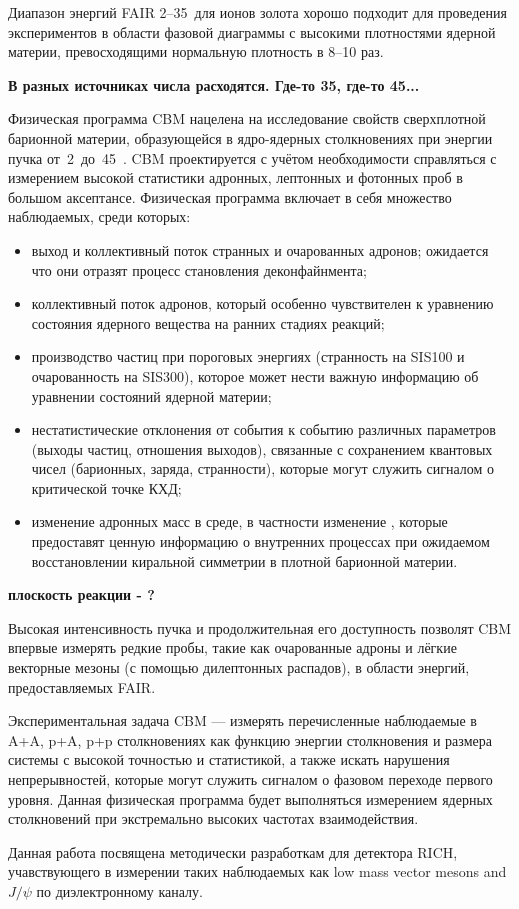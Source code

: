 Диапазон энергий FAIR 2--35~\GeVperNucl для ионов золота хорошо подходит для проведения экспериментов в области фазовой диаграммы с высокими плотностями ядерной материи, превосходящими нормальную плотность в 8--10 раз.

\todo \textbf{В разных источниках числа расходятся. Где-то 35, где-то 45...}

Физическая программа CBM нацелена на исследование свойств сверхплотной барионной материи, образующейся в ядро-ядерных столкновениях при энергии пучка от~2~до~45~\GeVperNucl. CBM проектируется с учётом необходимости справляться с измерением высокой статистики адронных, лептонных и фотонных проб в большом аксептансе. Физическая программа включает в себя множество наблюдаемых, среди которых:

\begin{itemize}
\item выход и коллективный поток странных и очарованных адронов; ожидается что они отразят процесс становления деконфайнмента;
\item коллективный поток адронов, который особенно чувствителен к уравнению состояния ядерного вещества на ранних стадиях реакций;
\item производство частиц при пороговых энергиях (странность на SIS100 и очарованность на SIS300), которое может нести важную информацию об уравнении состояний ядерной материи;
\item нестатистические отклонения от события к событию различных параметров (выходы частиц, отношения выходов), связанные с сохранением квантовых чисел (барионных, заряда, странности), которые могут служить сигналом о критической точке КХД;
\item изменение адронных масс в среде, в частности изменение \todo, которые предоставят ценную информацию о внутренних процессах при ожидаемом восстановлении киральной симметрии в плотной барионной материи.
\end{itemize}

\todo \textbf{плоскость реакции - ?}

Высокая интенсивность пучка и продолжительная его доступность позволят CBM впервые измерять редкие пробы, такие как очарованные адроны и лёгкие векторные мезоны (с помощью дилептонных распадов), в области энергий, предоставляемых FAIR.

Экспериментальная задача CBM --- измерять перечисленные наблюдаемые в A+A, p+A, p+p столкновениях как функцию энергии столкновения и размера системы с высокой точностью и статистикой, а также искать нарушения непрерывностей, которые могут служить сигналом о фазовом переходе первого уровня. Данная физическая программа будет выполняться измерением ядерных столкновений при экстремально высоких частотах взаимодействия.

Данная работа посвящена методически разработкам для детектора RICH, учавствующего в измерении таких наблюдаемых как low mass vector mesons and $J/\psi$ по диэлектронному каналу.









